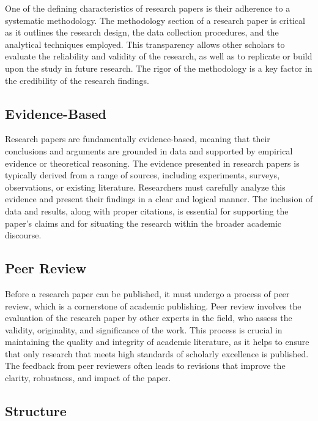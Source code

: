 \documentclass[
]{book}
\begin{document}
One of the defining characteristics of research papers is their adherence to a systematic methodology. The methodology section of a research paper is critical as it outlines the research design, the data collection procedures, and the analytical techniques employed. This transparency allows other scholars to evaluate the reliability and validity of the research, as well as to replicate or build upon the study in future research. The rigor of the methodology is a key factor in the credibility of the research findings.

\subsection*{Evidence-Based}\label{evidence-based}

Research papers are fundamentally evidence-based, meaning that their conclusions and arguments are grounded in data and supported by empirical evidence or theoretical reasoning. The evidence presented in research papers is typically derived from a range of sources, including experiments, surveys, observations, or existing literature. Researchers must carefully analyze this evidence and present their findings in a clear and logical manner. The inclusion of data and results, along with proper citations, is essential for supporting the paper's claims and for situating the research within the broader academic discourse.

\subsection*{Peer Review}\label{peer-review}

Before a research paper can be published, it must undergo a process of peer review, which is a cornerstone of academic publishing. Peer review involves the evaluation of the research paper by other experts in the field, who assess the validity, originality, and significance of the work. This process is crucial in maintaining the quality and integrity of academic literature, as it helps to ensure that only research that meets high standards of scholarly excellence is published. The feedback from peer reviewers often leads to revisions that improve the clarity, robustness, and impact of the paper.

\subsection*{Structure}\label{structure}
\end{document}
